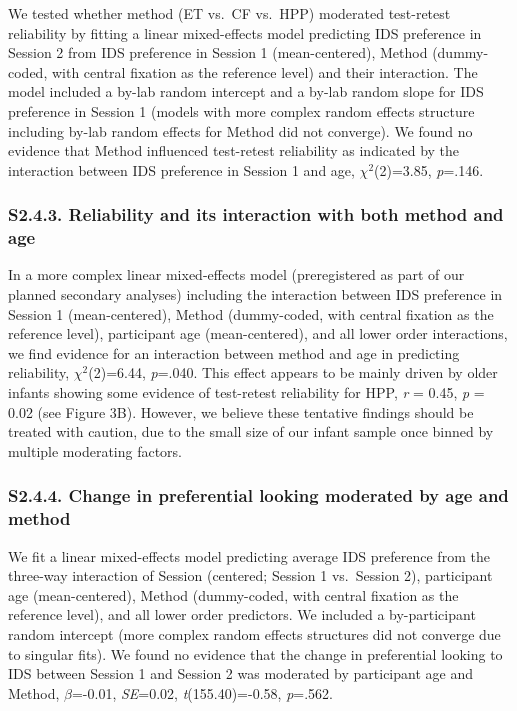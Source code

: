 \documentclass[
  english,
  man, donotrepeattitle,floatsintext]{apa6}
\begin{document}
We tested whether method (ET vs.~CF vs.~HPP) moderated test-retest reliability by fitting a linear mixed-effects model predicting IDS preference in Session 2 from IDS preference in Session 1 (mean-centered), Method (dummy-coded, with central fixation as the reference level) and their interaction.
The model included a by-lab random intercept and a by-lab random slope for IDS preference in Session 1 (models with more complex random effects structure including by-lab random effects for Method did not converge).
We found no evidence that Method influenced test-retest reliability as indicated by the interaction between IDS preference in Session 1 and age, \({\chi}^2\)(2)=3.85, \emph{p}=.146.

\hypertarget{s2.4.3.-reliability-and-its-interaction-with-both-method-and-age}{%
\subsubsection{S2.4.3. Reliability and its interaction with both method and age}\label{s2.4.3.-reliability-and-its-interaction-with-both-method-and-age}}

In a more complex linear mixed-effects model (preregistered as part of our planned secondary analyses) including the interaction between IDS preference in Session 1 (mean-centered), Method (dummy-coded, with central fixation as the reference level), participant age (mean-centered), and all lower order interactions, we find evidence for an interaction between method and age in predicting reliability, \({\chi}^2\)(2)=6.44, \emph{p}=.040.
This effect appears to be mainly driven by older infants showing some evidence of test-retest reliability for HPP, \emph{r} = 0.45, \emph{p} = 0.02 (see Figure 3B).
However, we believe these tentative findings should be treated with caution, due to the small size of our infant sample once binned by multiple moderating factors.

\hypertarget{s2.4.4.-change-in-preferential-looking-moderated-by-age-and-method}{%
\subsubsection{S2.4.4. Change in preferential looking moderated by age and method}\label{s2.4.4.-change-in-preferential-looking-moderated-by-age-and-method}}

We fit a linear mixed-effects model predicting average IDS preference from the three-way interaction of Session (centered; Session 1 vs.~Session 2), participant age (mean-centered), Method (dummy-coded, with central fixation as the reference level), and all lower order predictors.
We included a by-participant random intercept (more complex random effects structures did not converge due to singular fits).
We found no evidence that the change in preferential looking to IDS between Session 1 and Session 2 was moderated by participant age and Method, \(\beta\)=-0.01, \emph{SE}=0.02, \emph{t}(155.40)=-0.58, \emph{p}=.562.
\end{document}
